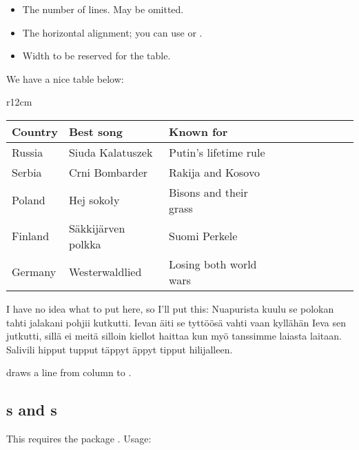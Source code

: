 \begin{itemize}
\item {} The number of lines. May be omitted.
\item {} The horizontal alignment; you can use  or .
\item {} Width to be reserved for the table.
\end{itemize}

\begin{examplef}
We have a nice table below:

\begin{wraptable}[9]{r}{12cm}
\vspace{-11pt}
\hspace{20pt}
\begin{tabular}[c]{|l|| *9{l|} }\hline
  Country & Best song & Known for \\\hline\hline
  Russia & Siuda Kalatuszek & Putin's lifetime rule \\\hline
  Serbia & Crni Bombarder & Rakija and Kosovo \\\hline
  Poland & Hej soko\l{}y & Bisons and their grass \\\hline
  Finland & S\"akkij\"arven polkka & Suomi Perkele \\\hline
  Germany & Westerwaldlied & Losing both world wars \\\hline
\end{tabular}
\hspace{5pt}
\end{wraptable}
I have no idea what to put here, so I'll put this:
Nuapurista kuulu se polokan tahti jalakani pohjii kutkutti.
Ievan \"aiti se tytt\"o\"os\"a vahti vaan kyll\"ah\"an Ieva sen jutkutti,
sill\"a ei meit\"a silloin kiellot haittaa kun my\"o tanssimme laiasta laitaan.
Salivili hipput tupput t\"appyt \"appyt tipput hilijalleen.
\end{examplef}



 draws a line from column  to .

\subsection{s and s}
This requires the package .
Usage:\
\begin{latex}
\end{latex}

